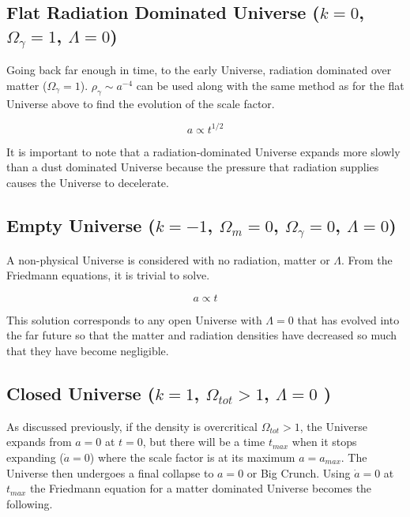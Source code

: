 \documentclass[12pt]{article} %
\begin{document}
\subsection{Flat Radiation Dominated Universe ($k=0$, $\Omega_{\gamma}=1$, $\Lambda=0$)}

Going back far enough in time, to the early Universe, radiation dominated over matter ($\Omega_{\gamma}=1$). $\rho_{\gamma} \sim a^{-4}$ can be used along with the same method as for the flat Universe above to find the evolution of the scale factor.

\begin{equation}
a\propto t^{1/2}
\end{equation}

It is important to note that a radiation-dominated Universe expands more slowly than a dust dominated Universe because the pressure that radiation supplies causes the Universe to decelerate.

\subsection{Empty Universe ($k=-1$, $\Omega_{m}=0$, $\Omega_{\gamma}=0$, $\Lambda = 0$)}

A non-physical Universe is considered with no radiation, matter or $\Lambda$. From the Friedmann equations, it is trivial to solve.

\begin{equation}
a \propto t
\end{equation}

This solution corresponds to any open Universe with $\Lambda=0$ that has evolved into the far future so that the matter and radiation densities have decreased so much that they have become negligible\cite{pritchard}.

\subsection{Closed Universe ($k=1$, $\Omega_{tot}>1$, $\Lambda=0$ )}

As discussed previously, if the density is overcritical $\Omega_{tot}>1$, the Universe expands from $a=0$ at $t=0$, but there will be a time $t_{max}$ when it stops expanding ($\dot a =0$) where the scale factor is at its maximum $a=a_{max}$. The Universe then undergoes a final collapse to $a=0$ or Big Crunch\cite{manchester}. Using $\dot a =0$ at $t_{max}$ the Friedmann equation for a matter dominated Universe becomes the following.
\end{document}

